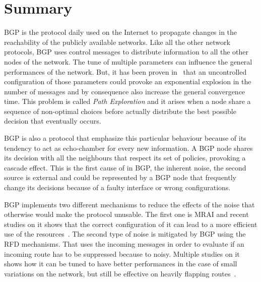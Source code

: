 \chapter*{Summary} %
\label{cha:summary}



\ac{BGP} is the protocol daily used on the Internet to propagate changes in the
reachability of the publicly available networks.
Like all the other network protocols, \ac{BGP} uses control messages to distribute
information to all the other nodes of the network.
The tune of multiple parameters can influence the general performances of the
network.
But, it has been proven in~\cite{fabrikant2011there} that an uncontrolled configuration
of those parameters could provoke an exponential explosion in the number of messages
and by consequence also increase the general convergence time.
This problem is called \textit{Path Exploration} and it arises when a node share
a sequence of non-optimal choices before actually distribute the best possible
decision that eventually occurs.

\ac{BGP} is also a protocol that emphasize this particular behaviour because of
its tendency to act as echo-chamber for every new information.
A \ac{BGP} node shares its decision with all the neighbours that respect
its set of policies, provoking a cascade effect.
This is the first cause of  in \ac{BGP}, the inherent noise, the second
source is external and could be represented by a \ac{BGP} node that frequently
change its decisions because of a faulty interface or wrong configurations.

\ac{BGP} implements two different mechanisms to reduce the effects of the
noise that otherwise would make the protocol unusable.
The first one is \ac{MRAI} and recent studies on it shows that the correct
configuration of it can lead to a more efficient use of the
resources~\cite{griffin2001experimental,fabrikant2011there,deshpande2004impact,milani2020improving}.
The second type of noise is mitigated by \ac{BGP} using the \ac{RFD} mechanisms.
That uses the incoming messages in order to evaluate if an incoming route has
to be suppressed because to noisy.
Multiple studies on it shows how it can be tuned to have better performances in
the case of small variations on the network, but still be effective on heavily
flapping routes~\cite{mao2002route,gray2020bgp,rfc7196}.

